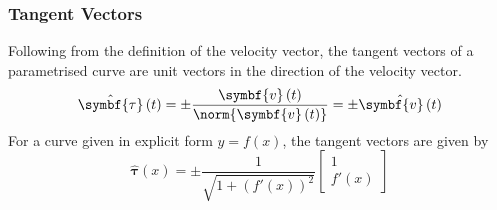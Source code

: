 \documentclass{article}
\begin{document}
\subsubsection{Tangent Vectors}
Following from the definition of the velocity vector, the tangent vectors of a parametrised curve
are unit vectors in the direction of the velocity vector.
\begin{equation*}
    \hat{\symbf{\tau}}\left( t \right) = \pm \frac{\symbf{v}\left( t \right)}{\norm{\symbf{v}\left( t \right)}} = \pm \hat{\symbf{v}\left( t \right)}
\end{equation*}
For a curve given in explicit form \(y = f\left( x \right)\), the tangent vectors are given by
\begin{equation*}
    \hat{\symbf{\tau}}\left( x \right) = \pm \frac{1}{\sqrt{1 + \left( f'\left( x \right) \right)^2}} \begin{bmatrix}
        1 \\
        f'\left( x \right)
    \end{bmatrix}
\end{equation*}
\end{document}
